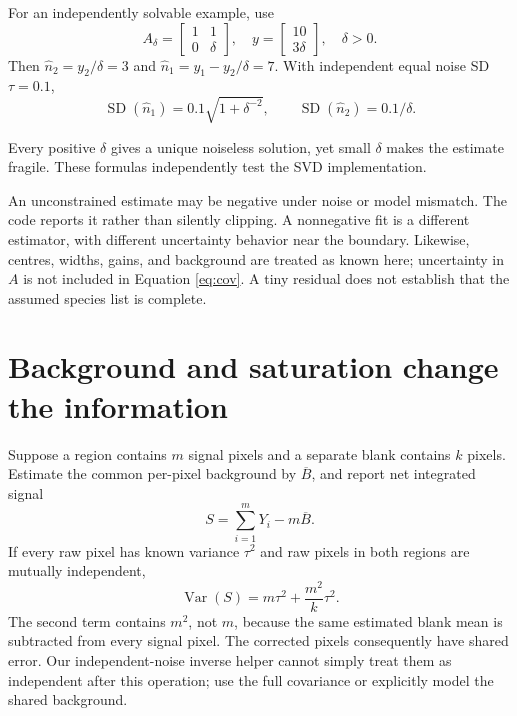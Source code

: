 For an independently solvable example, use
\begin{equation}
A_\delta=\begin{bmatrix}1&1\\0&\delta\end{bmatrix},
\quad y=\begin{bmatrix}10\\3\delta\end{bmatrix},\quad \delta>0.
\end{equation}
Then $\widehat n_2=y_2/\delta=3$ and $\widehat n_1=y_1-y_2/\delta=7$. With independent equal noise SD $\tau=0.1$,
\begin{equation}
\operatorname{SD}(\widehat n_1)=0.1\sqrt{1+\delta^{-2}},
\qquad \operatorname{SD}(\widehat n_2)=0.1/\delta.
\end{equation}
\begin{center}\end{center}
Every positive $\delta$ gives a unique noiseless solution, yet small $\delta$ makes the estimate fragile. These formulas independently test the SVD implementation.

An unconstrained estimate may be negative under noise or model mismatch. The code reports it rather than silently clipping. A nonnegative fit is a different estimator, with different uncertainty behavior near the boundary. Likewise, centres, widths, gains, and background are treated as known here; uncertainty in $A$ is not included in Equation \ref{eq:cov}. A tiny residual does not establish that the assumed species list is complete.

\section{Background and saturation change the information}
Suppose a region contains $m$ signal pixels and a separate blank contains $k$ pixels. Estimate the common per-pixel background by $\overline B$, and report net integrated signal
\begin{equation}
S=\sum_{i=1}^{m}Y_i-m\overline B.
\end{equation}
If every raw pixel has known variance $\tau^2$ and raw pixels in both regions are mutually independent,
\begin{equation}
\operatorname{Var}(S)=m\tau^2+\frac{m^2}{k}\tau^2. \label{eq:blank}
\end{equation}
The second term contains $m^2$, not $m$, because the same estimated blank mean is subtracted from every signal pixel. The corrected pixels consequently have shared error. Our independent-noise inverse helper cannot simply treat them as independent after this operation; use the full covariance or explicitly model the shared background.

